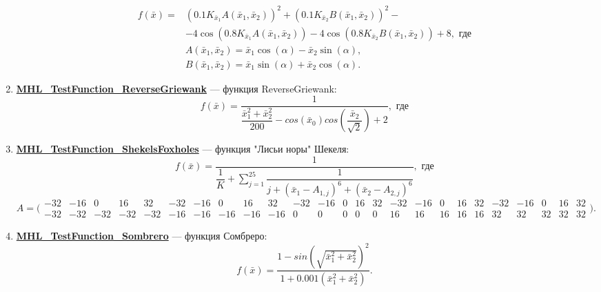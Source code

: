 \begin{enumerate}
 \begin{align}
 f\left( \bar{x}\right) =&{\left( 0.1 K_{\bar{x}_1}A\left( \bar{x}_1,\bar{x}_2\right) \right) }^2+{\left( 0.1 K_{\bar{x}_2}B\left( \bar{x}_1,\bar{x}_2\right) \right) }^2-
 \\&-4\cos\left( 0.8K_{\bar{x}_1}A\left( \bar{x}_1,\bar{x}_2\right)\right) -4\cos\left( 0.8K_{\bar{x}_2}B\left( \bar{x}_1,\bar{x}_2\right)\right) +8, \text{ где}\nonumber
 \\&A\left( \bar{x}_1,\bar{x}_2\right)= \bar{x}_1\cos\left( \alpha\right) -\bar{x}_2\sin\left( \alpha\right),\nonumber
 \\&B\left( \bar{x}_1,\bar{x}_2\right)= \bar{x}_1\sin\left( \alpha\right) +\bar{x}_2\cos\left( \alpha\right).\nonumber
 \end{align}
 \item \hyperref[TestFunctions:section:MHL_TestFunction_ReverseGriewank]{\textbf{MHL\_TestFunction\_ReverseGriewank}} --- функция ReverseGriewank:
 \begin{equation}
 f\left( \bar{x}\right) = \dfrac{1}{\dfrac{\bar{x}_1^2+\bar{x}_2^2}{200}-cos\left( \bar{x}_0\right)cos\left( \dfrac{\bar{x}_2}{\sqrt{2}}\right)+2  }, \text{ где}
 \end{equation}
 \item \hyperref[TestFunctions:section:MHL_TestFunction_ShekelsFoxholes]{\textbf{MHL\_TestFunction\_ShekelsFoxholes}} --- функция "Лисьи норы" Шекеля:
 \begin{equation}
 f\left( \bar{x}\right) = \dfrac{1}{\dfrac{1}{K}+\sum_{j=1}^{25}\dfrac{1}{j+\left( \bar{x}_1-A_{1,j}\right)^6+ \left( \bar{x}_2-A_{2,j}\right)^6}}, \text{ где}
 \end{equation}
 \begin{equation*}
 A =  \bigl(\begin{smallmatrix}
 -32 & -16 & 0 & 16 & 32 & -32 & -16 & 0 & 16 & 32 & -32 & -16 & 0 & 16 & 32 & -32 & -16 & 0 & 16 & 32 & -32 & -16 & 0 & 16 & 32\\
 -32 & -32 & -32 & -32 & -32 & -16 & -16 & -16 & -16 & -16 & 0 & 0 & 0 & 0 & 0 & 16 & 16 & 16 & 16 & 16 & 32 & 32 & 32 & 32 & 32
 \end{smallmatrix}\bigr).
 \end{equation*}
 \item \hyperref[TestFunctions:section:MHL_TestFunction_Sombrero]{\textbf{MHL\_TestFunction\_Sombrero}} --- функция Сомбреро:
 \begin{equation}
 f\left( \bar{x}\right) =\dfrac{1-{sin\left( \sqrt{\bar{x}_1^2+\bar{x}_2^2}\right)}^2 }{1+0.001\left(\bar{x}_1^2+\bar{x}_2^2 \right) }.

\end{equation}
\end{enumerate}
